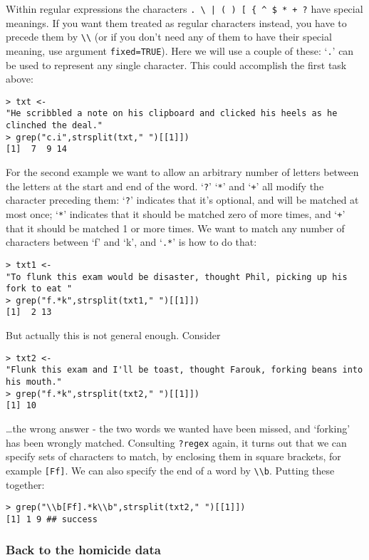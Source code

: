 \documentclass[10pt] {article}
\theoremstyle{definition}
\begin{document}
Within regular expressions the characters  \verb-. \ | ( ) [ { ^ $ * + ?- have special meanings. If you want them treated  as regular characters instead, you have to precede them by \verb+\\+ (or if you don't need any of them to have their special meaning, use argument \lstinline+fixed=TRUE+). Here we will use a couple of these: `\verb+.+' can be used to represent any single character. This could accomplish the first task above:
\begin{lstlisting}
> txt <- 
"He scribbled a note on his clipboard and clicked his heels as he clinched the deal."
> grep("c.i",strsplit(txt," ")[[1]])
[1]  7  9 14
\end{lstlisting}
For the second example we want to allow an arbitrary number of letters between the letters at the start and end of the word. `\verb+?+'  `\verb+*+' and `\verb-+-' all modify the character preceding them: `\verb+?+' indicates that it's optional, and will be matched at most once; `\verb+*+' indicates that it should be matched zero of more times, and `\verb-+-' that it should be matched 1 or more times. We want to match any number of characters between `f' and `k', and `\verb+.*+' is how to do that:
\begin{lstlisting}
> txt1 <- 
"To flunk this exam would be disaster, thought Phil, picking up his fork to eat "
> grep("f.*k",strsplit(txt1," ")[[1]])
[1]  2 13
\end{lstlisting}
But actually this is not general enough. Consider 
\begin{lstlisting}
> txt2 <- 
"Flunk this exam and I'll be toast, thought Farouk, forking beans into his mouth."
> grep("f.*k",strsplit(txt2," ")[[1]])
[1] 10
\end{lstlisting}
\ldots the wrong answer - the two words we wanted have been missed, and `forking' has been wrongly matched. Consulting {\tt ?regex} again, it turns out that we can specify sets of characters to match, by enclosing them in square brackets, for example \verb+[Ff]+. We can also specify the end of a word by \verb+\\b+. Putting these together:
\begin{lstlisting}
> grep("\\b[Ff].*k\\b",strsplit(txt2," ")[[1]])
[1] 1 9 ## success
\end{lstlisting}

\subsubsection*{Back to the homicide data}
\end{document}
